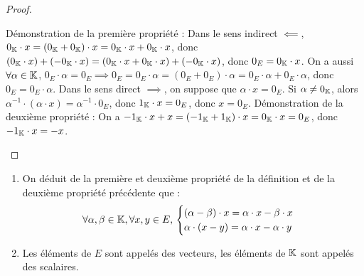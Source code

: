\documentclass[12pt, a4paper]{report}
\begin{document}
\begin{proof}
    \begin{outline}
        \1 Démonstration de la première propriété :
            \2 Dans le sens indirect $\impliedby$, $0_{\mathbb{K}} \cdot x = (0_{\mathbb{K}} + 0_{\mathbb{K}}) \cdot x = 0_{\mathbb{K}} \cdot x + 0_{\mathbb{K}} \cdot x$, donc $(0_{\mathbb{K}} \cdot x) + (-0_{\mathbb{K}} \cdot x) = (0_{\mathbb{K}} \cdot x + 0_{\mathbb{K}} \cdot x) + (-0_{\mathbb{K}} \cdot x)$, donc $0_E = 0_{\mathbb{K}} \cdot x$.
            \2 On a aussi $\forall \alpha \in \mathbb{K}$, $0_E \cdot \alpha = 0_E \implies 0_E = 0_E \cdot \alpha = (0_E + 0_E) \cdot \alpha = 0_E \cdot \alpha + 0_E \cdot \alpha$, donc $0_E = 0_E \cdot \alpha$.
            \2 Dans le sens direct $\implies$, on suppose que $\alpha \cdot x = 0_E$. Si $\alpha \ne 0_{\mathbb{K}}$, alors $\alpha^{-1} \cdot (\alpha \cdot x) = \alpha^{-1} \cdot 0_E$, donc $1_{\mathbb{K}} \cdot x = 0_E$, donc $x = 0_E$.
        \1 Démonstration de la deuxième propriété :
            \2 On a $-1_{\mathbb{K}} \cdot x + x = (-1_{\mathbb{K}} + 1_{\mathbb{K}}) \cdot x = 0_{\mathbb{K}} \cdot x = 0_E$, donc $-1_{\mathbb{K}} \cdot x = -x$.
    \end{outline}
\end{proof}

\begin{remark}
    \begin{enumerate}
        \item On déduit de la première et deuxième propriété de la définition et de la deuxième propriété précédente que :
        $$\forall \alpha,\beta \in \mathbb{K}, \forall x,y \in E,\\
        \begin{cases}
        (\alpha - \beta) \cdot x = \alpha \cdot x - \beta \cdot x\\
        \alpha \cdot (x - y) = \alpha \cdot x - \alpha \cdot y
        \end{cases}$$
        \item Les éléments de $E$ sont appelés des vecteurs, les éléments de $\mathbb{K}$ sont appelés des scalaires.
    \end{enumerate}
\end{remark}
\end{document}
